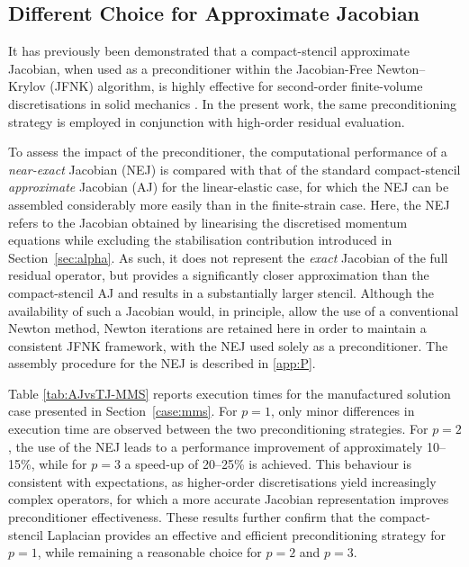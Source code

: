 \documentclass[review,3p]{elsarticle}
\begin{document}
\subsection{Different Choice for Approximate Jacobian}
\label{case:Different_Choice_for_Approximate_Jacobian}
%
It has previously been demonstrated that a compact-stencil approximate Jacobian, when used as a preconditioner within the Jacobian-Free Newton–Krylov (JFNK) algorithm, is highly effective for second-order finite-volume discretisations in solid mechanics \cite{Cardiff2026}. In the present work, the same preconditioning strategy is employed in conjunction with high-order residual evaluation.

To assess the impact of the preconditioner, the computational performance of a \emph{near-exact} Jacobian (NEJ) is compared with that of the standard compact-stencil \emph{approximate} Jacobian (AJ) for the linear-elastic case, for which the NEJ can be assembled considerably more easily than in the finite-strain case.
Here, the NEJ refers to the Jacobian obtained by linearising the discretised momentum equations while excluding the stabilisation contribution
introduced in Section~\ref{sec:alpha}. As such, it does not represent the \emph{exact} Jacobian of the full residual operator, but provides a significantly closer approximation than the compact-stencil AJ and results in a substantially larger stencil.
Although the availability of such a Jacobian would, in
principle, allow the use of a conventional Newton method, Newton iterations are retained here in
order to maintain a consistent JFNK framework, with the NEJ used solely as a preconditioner. The
assembly procedure for the NEJ is described in \ref{app:P}.

Table \ref{tab:AJvsTJ-MMS} reports execution times for the manufactured solution case presented in Section~\ref{case:mms}.
For $p=1$, only minor differences in execution time are observed between the two preconditioning strategies. 
For $p=2$, the use of the NEJ leads to a performance improvement of approximately 10–15\%, while for $p=3$ a speed-up of 20–25\% is achieved. 
This behaviour is consistent with expectations, as higher-order discretisations yield increasingly complex operators, for which a more accurate Jacobian representation improves preconditioner effectiveness. These results further confirm that the compact-stencil Laplacian provides an effective and efficient preconditioning strategy for $p=1$, while remaining a reasonable choice for $p=2$ and $p=3$.
\end{document}
